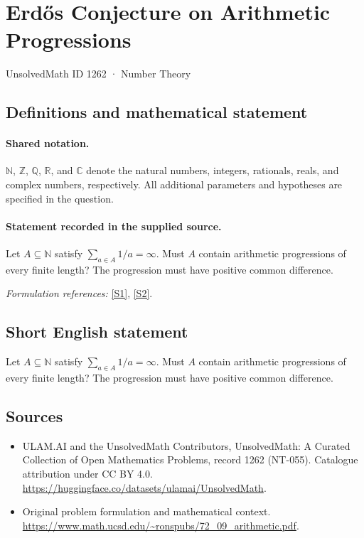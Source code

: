 \documentclass[11pt]{article}
\newcommand{\sref}[2]{\hyperlink{source:#1:#2}{[S#2]}}
\begin{document}
\setcounter{section}{1261}
\section{Erdős Conjecture on Arithmetic Progressions}\label{1262}
{\small UnsolvedMath ID 1262 · Number Theory}
\subsection{Definitions and mathematical statement}

\paragraph{Shared notation.}$\mathbb N$, $\mathbb Z$, $\mathbb Q$, $\mathbb R$, and $\mathbb C$ denote the natural numbers, integers, rationals, reals, and complex numbers, respectively. All additional parameters and hypotheses are specified in the question.


\paragraph{Statement recorded in the supplied source.}
Let $A\subseteq\mathbb N$ satisfy $\sum_{a\in A}1/a=\infty$. Must $A$ contain arithmetic progressions of every finite length? The progression must have positive common difference.
\par\smallskip\textit{Formulation references:} \sref{1262}{1}, \sref{1262}{2}.
\subsection{Short English statement}
Let $A\subseteq\mathbb N$ satisfy $\sum_{a\in A}1/a=\infty$. Must $A$ contain arithmetic progressions of every finite length? The progression must have positive common difference.
\subsection{Sources}
\begin{itemize}
\item[\hypertarget{source:1262:1}{S1}] ULAM.AI and the UnsolvedMath Contributors, UnsolvedMath: A Curated Collection of Open Mathematics Problems, record 1262 (NT-055). Catalogue attribution under CC BY 4.0.
\url{https://huggingface.co/datasets/ulamai/UnsolvedMath}.
\item[\hypertarget{source:1262:2}{S2}] Original problem formulation and mathematical context.
\url{https://www.math.ucsd.edu/~ronspubs/72_09_arithmetic.pdf}.
\end{itemize}
\label{end:1262}
\end{document}
